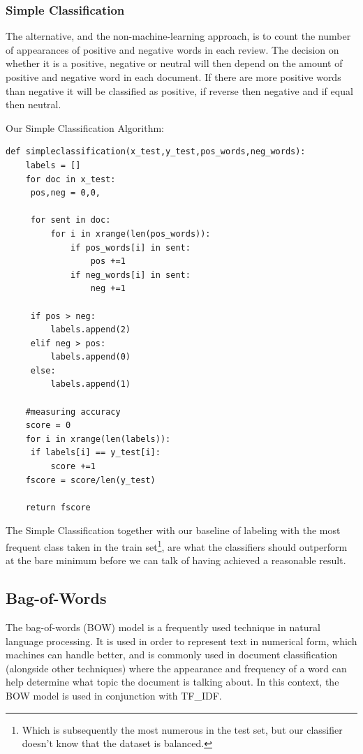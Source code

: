 \documentclass{article}
\begin{document}
\subsubsection{Simple Classification}

The alternative, and the non-machine-learning approach, is to count the number of appearances of positive and negative words in each review. The decision on whether it is a positive, negative or neutral will then depend on the amount of positive and negative word in each document. If there are more positive words than negative it will be classified as positive, if reverse then negative and if equal then neutral.  

Our Simple Classification Algorithm:

\begin{lstlisting}
def simpleclassification(x_test,y_test,pos_words,neg_words):
    labels = []
    for doc in x_test:
   	 pos,neg = 0,0,

   	 for sent in doc:
   		 for i in xrange(len(pos_words)):
   			 if pos_words[i] in sent:
   				 pos +=1
   			 if neg_words[i] in sent:
   				 neg +=1

   	 if pos > neg:
   		 labels.append(2)
   	 elif neg > pos:
   		 labels.append(0)
   	 else:
   		 labels.append(1)

    #measuring accuracy
    score = 0
    for i in xrange(len(labels)):
   	 if labels[i] == y_test[i]:
   		 score +=1
    fscore = score/len(y_test)

    return fscore
\end{lstlisting}

The Simple Classification together with our baseline of labeling with the most frequent class taken in the train set\footnote{Which is subsequently the most numerous in the test set, but our classifier doesn't know that the dataset is balanced.}, are what the classifiers should outperform at the bare minimum before we can talk of having achieved a reasonable result.  

\subsection{Bag-of-Words}
The bag-of-words (BOW) model is a frequently used technique in natural language processing. It is used in order to represent text in numerical form, which machines can handle better, and is commonly used in document classification (alongside other techniques) where the appearance and frequency of a word can help determine what topic the document is talking about. In this context, the BOW model is used in conjunction with TF\_IDF.
\end{document}
